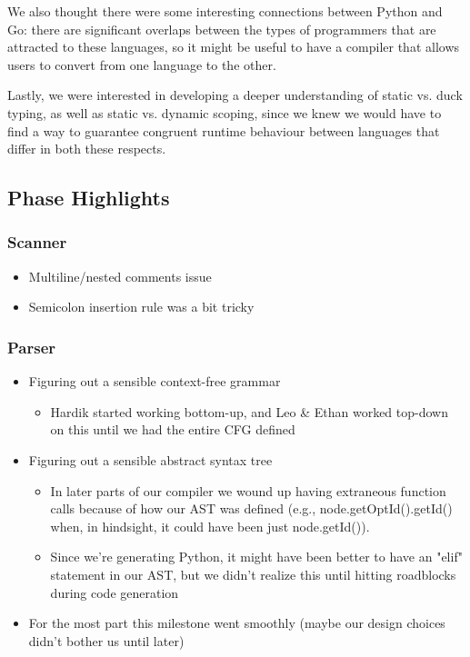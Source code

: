\documentclass{article}
\begin{document}
We also thought there were some interesting connections between Python and Go: there are significant overlaps between the types of programmers that are attracted to these languages, so it might be useful to have a compiler that allows users to convert from one language to the other. 

Lastly, we were interested in developing a deeper understanding of static vs. duck typing, as well as static vs. dynamic scoping, since we knew we would have to find a way to guarantee congruent runtime behaviour between languages that differ in both these respects.
	
\subsection{Phase Highlights}

\subsubsection{Scanner}
\begin{itemize}
\item Multiline/nested comments issue
\item Semicolon insertion rule was a bit tricky
\end{itemize}
\subsubsection{Parser}
\begin{itemize}
\item Figuring out a sensible context-free grammar
\begin{itemize}
	\item Hardik started working bottom-up, and Leo \& Ethan worked top-down on this until we had the entire CFG defined
\end{itemize}
\item Figuring out a sensible abstract syntax tree
\begin{itemize}
	\item In later parts of our compiler we wound up having extraneous function calls because of how our AST was defined (e.g., node.getOptId().getId() when, in hindsight, it could have been just node.getId()).
	\item Since we're generating Python, it might have been better to have an "elif" statement in our AST, but we didn't realize this until hitting roadblocks during code generation
\end{itemize}
\item For the most part this milestone went smoothly (maybe our design choices didn't bother us until later)
\end{itemize}
\end{document}
